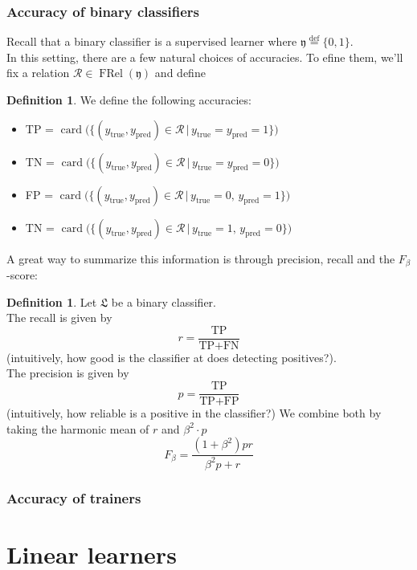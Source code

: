\documentclass{book}
\theoremstyle{plain}
\theoremstyle{definition}
\newtheorem{definition}[corollary]{Definition}
\DeclareMathOperator{\card}{card}
\newcommand{\define}{\stackrel{\operatorname{def}}{=}}
\newcommand{\f}[1]{\mathfrak{#1}}
\DeclareMathOperator{\FRel}{FRel}
\DeclareMathOperator{\pred}{pred}
\renewcommand{\r}[1]{\mathcal{#1}}
\DeclareMathOperator{\true}{true}
\begin{document}
\subsection{Accuracy of binary classifiers}
Recall that a binary classifier is a supervised learner where $\f{y}\define \{0,1\}$.\\
In this setting, there are a few natural choices of accuracies. To efine them, we'll fix a relation $\r{R}\in \FRel(\f{y})$ and define
\begin{definition}\label{sl:def:binacc}
We define the following accuracies:
\begin{itemize}
\item TP = $\card\big(\big\{(y_{\true},y_{\pred}) \in \r{R}\, \vert\, y_{\true}=y_{\pred} = 1 \big\}\big)$
 \item TN = $\card\big(\big\{(y_{\true},y_{\pred}) \in \r{R} \, \vert\, y_{\true}=y_{\pred} = 0 \big\}\big)$
 \item FP = $\card\big(\big\{(y_{\true},y_{\pred}) \in \r{R}\, \vert\, y_{\true}=0,\, y_{\pred} = 1 \big\}\big)$
 \item TN = $\card\big(\big\{(y_{\true},y_{\pred}) \in \r{R}\, \vert\, y_{\true}=1,\, y_{\pred} = 0 \big\}\big)$
\end{itemize}
\end{definition}
A great way to summarize this information is through precision, recall and the $F_\beta$-score:
\begin{definition}
Let $\f{L}$ be a binary classifier.\\
The recall is given by
\[
r=\frac{\text{TP}}{\text{TP}+\text{FN}}
\]
(intuitively, how good is the classifier at does detecting positives?).\\
The precision is given by
\[
p= \frac{\text{TP}}{\text{TP}+\text{FP}}
\]
(intuitively, how reliable is a positive in the classifier?)
We combine both by taking the harmonic mean of $r$ and $\beta^2\cdot p$
\[
F_\beta = \frac{(1+\beta^2)pr}{\beta^2p+r}
\]
\end{definition}

\subsection{Accuracy of trainers}








\chapter{Linear learners}
\end{document}
